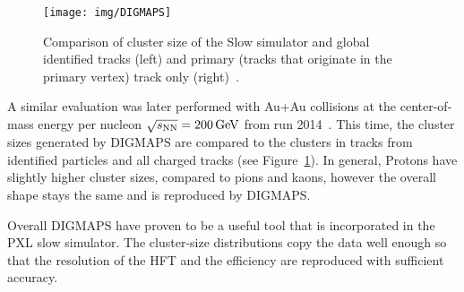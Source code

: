 \begin{figure}[!htb]
\begin{center}
 \texttt{[image: img/DIGMAPS]}\\
\end{center}
\caption{\label{AuAuDigmaps}Comparison of cluster size of the Slow simulator and global identified tracks (left) and primary (tracks that originate in the primary vertex) track only
(right)~\cite{KubaVyzkumak}.}
\end{figure}

A similar evaluation was later performed with Au+Au collisions at the center-of-mass energy per nucleon $\sqrt{s_\text{NN}} = \SI{200}{\giga\electronvolt}$ from run 2014~\cite{KubaVyzkumak}\@. This time, the cluster sizes generated by DIGMAPS are compared to the clusters in tracks from identified particles and all charged tracks (see Figure~\ref{AuAuDigmaps})\@.  In general, Protons have slightly higher cluster sizes, compared to pions and kaons, however the overall shape stays the same and is reproduced by DIGMAPS.

Overall DIGMAPS have proven to be a useful tool that is incorporated in the PXL slow simulator. The cluster-size distributions copy the data well enough so that the resolution of the HFT and the efficiency are reproduced with sufficient accuracy.
